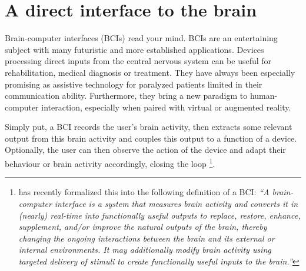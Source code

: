 

\section{A direct interface to the brain}

Brain-computer interfaces (BCIs) read your mind.
BCIs are an entertaining subject with many futuristic and more established
applications.
Devices processing direct inputs from the central nervous system can be
useful for rehabilitation, medical diagnosis or treatment.
They have always been especially promising as assistive technology for
paralyzed patients limited in their communication ability. 
Furthermore, they bring a new paradigm to human-computer interaction,
especially when paired with virtual or augmented reality.

Simply put, a BCI records the user's brain activity, then extracts some
relevant output from this brain activity and couples this output to a function
of a device.
Optionally, the user can then observe the action of the device and adapt their
behaviour or brain activity accordingly, closing the loop
\footnote{
  \textcite{BCISociety2024} has recently formalized this into the
  following definition of a BCI:
  \it``A brain-computer interface is a system that measures brain activity and
  converts it in (nearly) real-time into functionally useful outputs to replace,
  restore, enhance, supplement, and/or improve the natural outputs of the brain,
  thereby changing the ongoing interactions between the brain and its external or
  internal environments. It may additionally modify brain activity using targeted
  delivery of stimuli to create functionally useful inputs to the
  brain.''
}.


